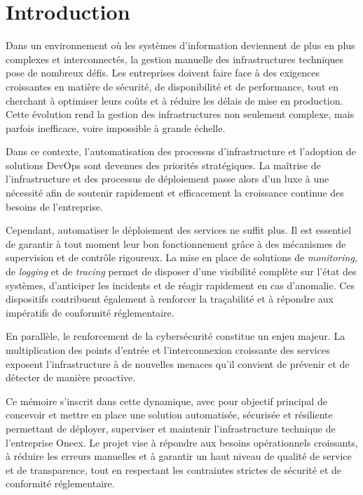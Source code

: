 \thispagestyle{mainmatter}

\section{Introduction}

Dans un environnement où les systèmes d'information deviennent de plus en plus complexes et interconnectés, la gestion manuelle des infrastructures techniques pose de nombreux défis. Les entreprises doivent faire face à des exigences croissantes en matière de sécurité, de disponibilité et de performance, tout en cherchant à optimiser leurs coûts et à réduire les délais de mise en production. Cette évolution rend la gestion des infrastructures non seulement complexe, mais parfois inefficace, voire impossible à grande échelle.

Dans ce contexte, l'automatisation des processus d'infrastructure et l'adoption de solutions DevOps sont devenues des priorités stratégiques. La maîtrise de l'infrastructure et des processus de déploiement passe alors d'un luxe à une nécessité afin de soutenir rapidement et efficacement la croissance continue des besoins de l'entreprise.

Cependant, automatiser le déploiement des services ne suffit plus. Il est essentiel de garantir à tout moment leur bon fonctionnement grâce à des mécanismes de supervision et de contrôle rigoureux. La mise en place de solutions de \emph{monitoring}, de \emph{logging} et de \emph{tracing} permet de disposer d'une visibilité complète sur l'état des systèmes, d'anticiper les incidents et de réagir rapidement en cas d'anomalie. Ces dispositifs contribuent également à renforcer la traçabilité et à répondre aux impératifs de conformité réglementaire.

En parallèle, le renforcement de la cybersécurité constitue un enjeu majeur. La multiplication des points d'entrée et l'interconnexion croissante des services exposent l'infrastructure à de nouvelles menaces qu'il convient de prévenir et de détecter de manière proactive.

Ce mémoire s'inscrit dans cette dynamique, avec pour objectif principal de concevoir et mettre en place une solution automatisée, sécurisée et résiliente permettant de déployer, superviser et maintenir l'infrastructure technique de l'entreprise Oneex. Le projet vise à répondre aux besoins opérationnels croissants, à réduire les erreurs manuelles et à garantir un haut niveau de qualité de service et de transparence, tout en respectant les contraintes strictes de sécurité et de conformité réglementaire.

